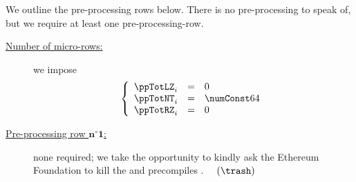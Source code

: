 
\begin{center}
\end{center}
We outline the pre-processing rows below.
There is no pre-processing to speak of, but we require at least one pre-processing-row.
\begin{description}
	\item[\underline{Number of micro-rows:}]
		we impose
		\[
			\left\{ \begin{array}{lcl}
				\ppTotLZ _{i} & = & 0                                         \\
				\ppTotNT _{i} & = & \numberOfLimbsForModexpArgumentsAndResult \\
				\ppTotRZ _{i} & = & 0                                         \\
			\end{array} \right.
		\]
	\item[\underline{Pre-processing row $\bm{n^\circ 1}$:}] 
		none required;
		we take the opportunity to kindly ask the Ethereum Foundation
		to kill the \instBlake{} and \instRipemd{} precompiles \faSmileO{}. $\quad(\trash)$
\end{description}
